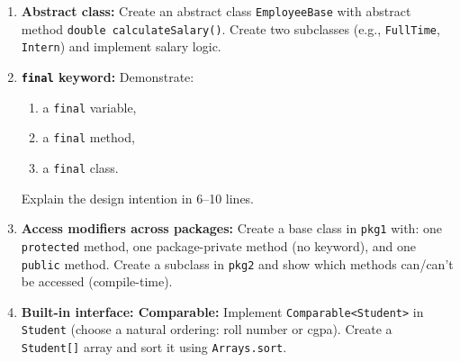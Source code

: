 \documentclass[11pt,a4paper]{article}
\begin{document}
\begin{enumerate}[label=M\arabic*., leftmargin=*]
  \item \textbf{Abstract class:} Create an abstract class \texttt{EmployeeBase} with abstract method
    \texttt{double calculateSalary()}. Create two subclasses (e.g., \texttt{FullTime}, \texttt{Intern}) and implement salary logic.

  \item \textbf{\texttt{final} keyword:} Demonstrate:
    \begin{enumerate}[label=(\alph*), leftmargin=*]
      \item a \texttt{final} variable,
      \item a \texttt{final} method,
      \item a \texttt{final} class.
    \end{enumerate}
    Explain the design intention in 6--10 lines.

  \item \textbf{Access modifiers across packages:} Create a base class in \texttt{pkg1} with:
    one \texttt{protected} method, one package-private method (no keyword), and one \texttt{public} method.
    Create a subclass in \texttt{pkg2} and show which methods can/can't be accessed (compile-time).

  \item \textbf{Built-in interface: Comparable:} Implement \texttt{Comparable<Student>} in \texttt{Student}
    (choose a natural ordering: roll number or cgpa).
    Create a \texttt{Student[]} array and sort it using \texttt{Arrays.sort}.
\end{enumerate}
\end{document}
